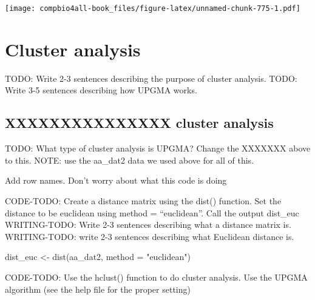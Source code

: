 \documentclass[
]{book}
\newenvironment{Shaded}{\begin{snugshade}}{\end{snugshade}}
\newcommand{\AttributeTok}[1]{\textcolor[rgb]{0.77,0.63,0.00}{#1}}
\newcommand{\CommentTok}[1]{\textcolor[rgb]{0.56,0.35,0.01}{\textit{#1}}}
\newcommand{\FunctionTok}[1]{\textcolor[rgb]{0.00,0.00,0.00}{#1}}
\newcommand{\NormalTok}[1]{#1}
\newcommand{\OtherTok}[1]{\textcolor[rgb]{0.56,0.35,0.01}{#1}}
\newcommand{\SpecialCharTok}[1]{\textcolor[rgb]{0.00,0.00,0.00}{#1}}
\newcommand{\StringTok}[1]{\textcolor[rgb]{0.31,0.60,0.02}{#1}}
\begin{document}
\texttt{[image: compbio4all-book\_files/figure-latex/unnamed-chunk-775-1.pdf]}

\hypertarget{cluster-analysis-2}{%
\section{Cluster analysis}\label{cluster-analysis-2}}

TODO: Write 2-3 sentences describing the purpose of cluster analysis.
TODO: Write 3-5 sentences describing how UPGMA works.

\hypertarget{xxxxxxxxxxxxxxx-cluster-analysis}{%
\subsection{XXXXXXXXXXXXXXX cluster analysis}\label{xxxxxxxxxxxxxxx-cluster-analysis}}

TODO: What type of cluster analysis is UPGMA? Change the XXXXXXX above to this.
NOTE: use the aa\_dat2 data we used above for all of this.

Add row names. Don't worry about what this code is doing

\begin{Shaded}
\end{Shaded}

CODE-TODO: Create a distance matrix using the dist() function. Set the distance to be euclidean using method = ``euclidean''. Call the output dist\_euc
WRITING-TODO: Write 2-3 sentences describing what a distance matrix is.
WRITING-TODO: write 2-3 sentences describing what Euclidean distance is.

\begin{Shaded}
\begin{Highlighting}[]
\NormalTok{dist\_euc }\OtherTok{\textless{}{-}} \FunctionTok{dist}\NormalTok{(aa\_dat2, }
                 \AttributeTok{method =} \StringTok{"euclidean"}\NormalTok{)}
\end{Highlighting}
\end{Shaded}

CODE-TODO: Use the hclust() function to do cluster analysis. Use the UPGMA algorithm (see the help file for the proper setting)
\end{document}
